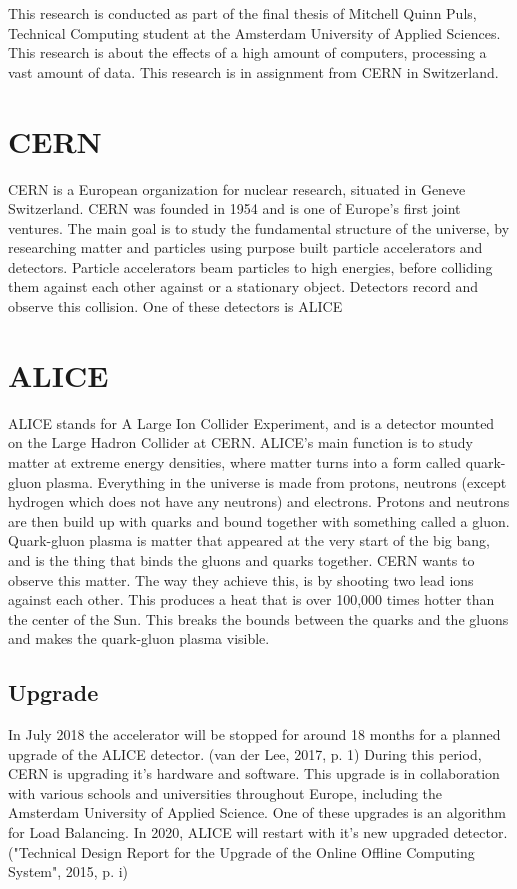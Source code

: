 This research is conducted as part of the final thesis of Mitchell Quinn Puls, Technical Computing student at the Amsterdam University of Applied Sciences. This research is about the effects of a high amount of computers, processing a vast amount of data. This research is in assignment from CERN in Switzerland. 
\section{CERN}
CERN is a European organization for  nuclear research, situated in Geneve Switzerland. CERN was founded in 1954 and is one of Europe's first joint ventures. The main goal is to study the fundamental structure of the universe, by researching matter and particles using purpose built particle accelerators and detectors. Particle accelerators beam particles to high energies, before colliding them against each other against or a stationary object. Detectors record and observe this collision. One of these detectors is ALICE
\section{ALICE}
ALICE stands for A Large Ion Collider Experiment, and is a detector mounted on the Large Hadron Collider at CERN.  ALICE's main function is to study matter at extreme energy densities, where matter turns into a form called quark-gluon plasma. Everything in the universe is made from protons, neutrons (except hydrogen which does not have any neutrons) and electrons. Protons and neutrons are then build up with quarks and bound together with something called a gluon. Quark-gluon plasma is matter that appeared at the very start of the big bang, and is the thing that binds the gluons and quarks together. CERN wants to observe this matter. The way they achieve this, is by shooting two lead ions against each other. This produces a heat that is over 100,000 times hotter than the center of the Sun. This breaks the bounds between the quarks and the gluons and makes the quark-gluon plasma visible.
\subsection{Upgrade}
In July 2018 the accelerator will be stopped for around 18 months for a planned upgrade of the ALICE detector. (van der Lee, 2017, p. 1) During this period, CERN is upgrading it's hardware and software. This upgrade is in collaboration with various schools and universities throughout Europe, including the Amsterdam University of Applied Science. One of these upgrades is an algorithm for Load Balancing. In 2020, ALICE will restart with it's new upgraded detector. ("Technical Design Report for the Upgrade of the Online Offline Computing System", 2015, p. i)

